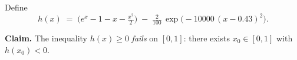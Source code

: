 \begin{problem}
Define
\[
  h(x) \;=\; \bigl(e^{x} - 1 - x - \tfrac{x^{2}}{2}\bigr)
            \;-\; \tfrac{2}{100}\,\exp\!\bigl(-10000\,(x - 0.43)^{2}\bigr).
\]

\textbf{Claim.} The inequality $h(x) \geq 0$ \emph{fails} on $[0, 1]$:
there exists $x_{0} \in [0, 1]$ with $h(x_{0}) < 0$.
\end{problem}
